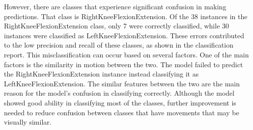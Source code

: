 However, there are classes that experience significant confusion in making predictions. That class is RightKneeFlexionExtension. Of the 38 instances in the RightKneeFlexionExtension class, only 7 were correctly classified, while 30 instances were classified as LeftKneeFlexionExtension. These errors contributed to the low precision and recall of these classes, as shown in the classification report. This misclassification can occur based on several factors. One of the main factors is the similarity in motion between the two. The model failed to predict the RightKneeFlexionExtension instance instead classifying it as LeftKneeFlexionExtension. The similar features between the two are the main reason for the model's confusion in classifying correctly. Although the model showed good ability in classifying most of the classes, further improvement is needed to reduce confusion between classes that have movements that may be visually similar.

